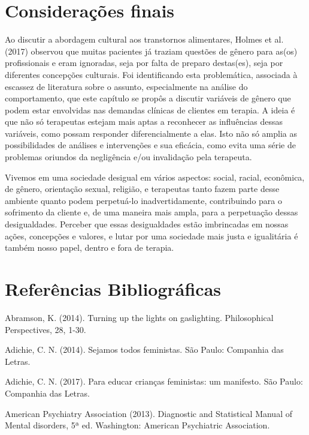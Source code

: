\section{Considerações finais}

Ao discutir a abordagem cultural aos transtornos alimentares, Holmes et al. (2017) observou que muitas pacientes já traziam questões de gênero para as(os) profissionais e eram ignoradas, seja por falta de preparo destas(es), seja por diferentes concepções culturais. Foi identificando esta problemática, associada à escassez de literatura sobre o assunto, especialmente na análise do comportamento, que este capítulo se propôs a discutir variáveis de gênero que podem estar envolvidas nas demandas clínicas de clientes em terapia. A ideia é que não só terapeutas estejam mais aptas a reconhecer as influências dessas variáveis, como possam responder diferencialmente a elas. Isto não só amplia as possibilidades de análises e intervenções e sua eficácia, como evita uma série de problemas oriundos da negligência e/ou invalidação pela terapeuta.

Vivemos em uma sociedade desigual em vários aspectos: social, racial, econômica, de gênero, orientação sexual, religião, e terapeutas tanto fazem parte desse ambiente quanto podem perpetuá-lo inadvertidamente, contribuindo para o sofrimento da cliente e, de uma maneira mais ampla, para a perpetuação dessas desigualdades. Perceber que essas desigualdades estão imbrincadas em nossas ações, concepções e valores, e lutar por uma sociedade mais justa e igualitária é também nosso papel, dentro e fora de terapia.

\section*{Referências Bibliográficas}

\hangindent=25pt
\noindent Abramson, K. (2014). Turning up the lights on gaslighting. Philosophical Perspectives, 28, 1-30.

\hangindent=25pt
\noindent Adichie, C. N. (2014). Sejamos todos feministas. São Paulo: Companhia das Letras.

\hangindent=25pt
\noindent Adichie, C. N. (2017). Para educar crianças feministas: um manifesto. São Paulo: Companhia das Letras. 

\hangindent=25pt
\noindent American Psychiatry Association (2013). Diagnostic and Statistical Manual of Mental disorders, 5ª ed. Washington: American Psychiatric Association.

